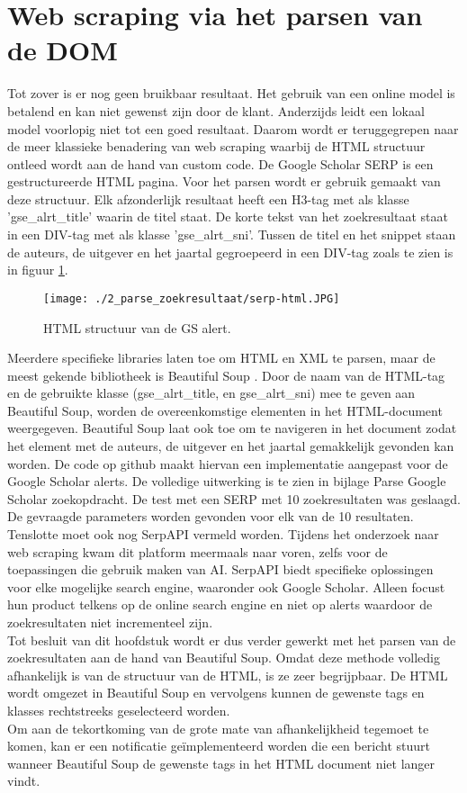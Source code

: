 \section{Web scraping via het parsen van de DOM}
Tot zover is er nog geen bruikbaar resultaat. Het gebruik van een online model is betalend en kan niet gewenst zijn door de klant. Anderzijds leidt een lokaal model voorlopig niet tot een goed resultaat. Daarom wordt er teruggegrepen naar de meer klassieke benadering van web scraping waarbij de HTML structuur ontleed wordt aan de hand van custom code.
De Google Scholar SERP is een gestructureerde HTML pagina. Voor het parsen wordt er gebruik gemaakt van deze structuur.
Elk afzonderlijk resultaat heeft een H3-tag met als klasse 'gse\_alrt\_title' waarin de titel staat. De korte tekst van het zoekresultaat staat in een DIV-tag met als klasse 'gse\_alrt\_sni'. Tussen de titel en het snippet staan de auteurs, de uitgever en het jaartal gegroepeerd in een DIV-tag zoals te zien is in figuur \ref{fig:serp-html}.
\begin{figure}
    \centering
    \texttt{[image: ./2\_parse\_zoekresultaat/serp-html.JPG]}
    \caption[HTML structuur van de GS alert.]{\label{fig:serp-html}HTML structuur van de GS alert.}
\end{figure}
\FloatBarrier
Meerdere specifieke libraries laten toe om HTML en XML te parsen, maar de meest gekende bibliotheek is Beautiful Soup \autocite{Soup2025}. Door de naam van de HTML-tag en de gebruikte klasse (gse\_alrt\_title, en gse\_alrt\_sni) mee te geven aan Beautiful Soup, worden de overeenkomstige elementen in het HTML-document weergegeven. Beautiful Soup laat ook toe om te navigeren in het document zodat het element met de auteurs, de uitgever en het jaartal gemakkelijk gevonden kan worden.
De code op github \textcite{DepaepeBeautifulsoup2025} maakt hiervan een implementatie aangepast voor de Google Scholar alerts. De volledige uitwerking is te zien in bijlage Parse Google Scholar zoekopdracht.
De test met een SERP met 10 zoekresultaten was geslaagd. De gevraagde parameters worden gevonden voor elk van de 10 resultaten.\\
Tenslotte moet ook nog SerpAPI \autocite{Serpapi2025} vermeld worden. Tijdens het onderzoek naar web scraping kwam dit platform meermaals naar voren, zelfs voor de toepassingen die gebruik maken van AI. SerpAPI biedt specifieke oplossingen voor elke mogelijke search engine, waaronder ook Google Scholar. Alleen focust hun product telkens op de online search engine en niet op alerts waardoor de zoekresultaten niet incrementeel zijn.\\
Tot besluit van dit hoofdstuk wordt er dus verder gewerkt met het parsen van de zoekresultaten aan de hand van Beautiful Soup. Omdat deze methode volledig afhankelijk is van de structuur van de HTML, is ze zeer begrijpbaar. De HTML wordt omgezet in Beautiful Soup en vervolgens kunnen de gewenste tags en klasses rechtstreeks geselecteerd worden.\\
Om aan de tekortkoming van de grote mate van afhankelijkheid tegemoet te komen, kan er een notificatie geïmplementeerd worden die een bericht stuurt wanneer Beautiful Soup de gewenste tags in het HTML document niet langer vindt.

